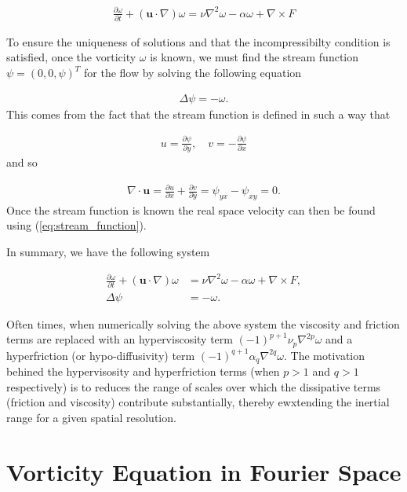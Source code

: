 \documentclass[9pt]{article}
\newcommand{\pder}[2]{\frac{\partial #1}{\partial #2}}               %
\newcommand{\curl}[1]{\nabla \times {#1}}								%
\newcommand{\bfu}{\mathbf{u}}											%
\begin{document}
\begin{align}
	\pder{\omega}{t} + \left(\bfu \cdot \nabla\right)\omega = \nu \nabla^2 \omega  - \alpha \omega +  \curl{F}
\end{align}

To ensure the uniqueness of solutions and that the incompressibilty condition is satisfied, once the vorticity $\omega$ is known, we must find the stream function $\psi = (0, 0, \psi)^T$ for the flow by solving the following equation

\begin{align}
	\Delta\psi = -\omega.
\end{align}
This comes from the fact that the stream function is defined in such a way that 

\begin{align}
	u = \pder{\psi}{y}, \quad v = -\pder{\psi}{x}
	\label{eq:stream_function}
\end{align}
and so

\begin{align}
\nabla \cdot \bfu = \pder{u}{x} + \pder{v}{y} = \psi_{y x}-\psi_{x y}=0.
\end{align}
Once the stream function is known the real space velocity can then be found using (\ref{eq:stream_function}).

In summary, we have the following system

\begin{align}
	\pder{\omega}{t} + \left(\bfu \cdot \nabla\right)\omega &=\nu \nabla^2\omega -\alpha \omega +  \curl{F}, \label{eq:vort_eq}\\
	\Delta\psi &= -\omega. \label{eq:laplace}
\end{align}

Often times, when numerically solving the above system the viscosity and friction terms are replaced with an hyperviscosity term $(-1)^{p + 1}\nu_p \nabla^{2p}\omega$ and a hyperfriction (or hypo-diffusivity) term $(-1)^{q + 1}\alpha_q \nabla^{2q}\omega$. The motivation behined the hypervisosity and hyperfriction terms (when $p > 1$ and $q > 1$ respectively) is to reduces the range of scales over which the dissipative terms (friction and viscosity) contribute substantially, thereby ewxtending the inertial range for a given spatial resolution.

\section{Vorticity Equation in Fourier Space}
\end{document}
